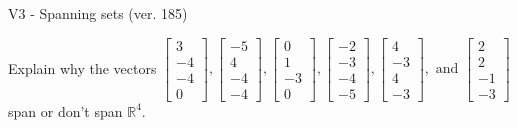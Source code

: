 \begin{exercise}
  \begin{exerciseTitle}V3 - Spanning sets (ver. 185)\end{exerciseTitle}
  \begin{exerciseStatement}
    Explain why the vectors \(\left[\begin{array}{r}
3 \\
-4 \\
-4 \\
0
\end{array}\right] , \left[\begin{array}{r}
-5 \\
4 \\
-4 \\
-4
\end{array}\right] , \left[\begin{array}{r}
0 \\
1 \\
-3 \\
0
\end{array}\right] , \left[\begin{array}{r}
-2 \\
-3 \\
-4 \\
-5
\end{array}\right] , \left[\begin{array}{r}
4 \\
-3 \\
4 \\
-3
\end{array}\right] , \text{ and } \left[\begin{array}{r}
2 \\
2 \\
-1 \\
-3
\end{array}\right]\) span or don't span \(\mathbb{R}^4\). 
	



\end{exerciseStatement}
\end{exercise}
